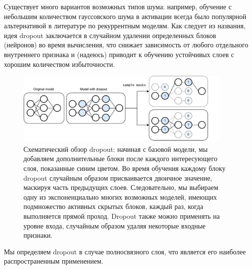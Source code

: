Существует много вариантов возможных типов шума: например, обучение с небольшим количеством гауссовского шума в активации всегда было популярной альтернативой в литературе по рекуррентным моделям. Как следует из названия, идея dropout заключается в случайном удалении определенных блоков (нейронов) во время вычисления, что снижает зависимость от любого отдельного внутреннего признака и (надеюсь) приводит к обучению устойчивых слоев с хорошим количеством избыточности.

\begin{figure}
    \centering
    \includegraphics[width=0.95\textwidth]{images/dropout}
    \caption{Схематический обзор dropout: начиная с базовой модели, мы добавляем дополнительные блоки после каждого интересующего слоя, показанные синим цветом. Во время обучения каждому блоку dropout случайным образом присваивается двоичное значение, маскируя часть предыдущих слоев. Следовательно, мы выбираем одну из экспоненциально многих возможных моделей, имеющих подмножество активных скрытых блоков, каждый раз, когда выполняется прямой проход. Dropout также можно применять на уровне входа, случайным образом удаляя некоторые входные признаки.}
    \label{fig:dropout}
\end{figure}

Мы определяем dropout в случае полносвязного слоя, что является его наиболее распространенным применением. 

